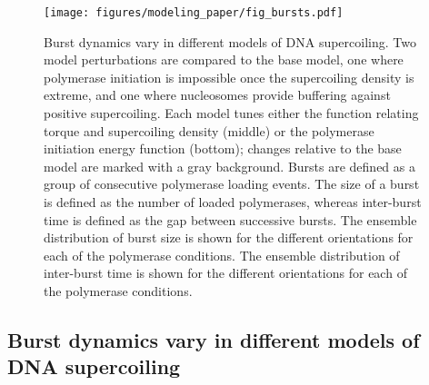 \documentclass[11pt]{article}
\begin{document}
\begin{figure}[htbp]
    \centering
    {\texttt{[image: figures/modeling\_paper/fig\_bursts.pdf]}
    \label{fig:perturbation_overview}
    \label{fig:burst_time_cartoon}
    \label{fig:burst_size_dynamics}
    \label{fig:interburst_time_dynamics}
    }
    \caption{Burst dynamics vary in different models of DNA supercoiling.
         Two model perturbations are compared to the base model, one where polymerase initiation is impossible once the supercoiling density is extreme, and one where nucleosomes provide buffering against positive supercoiling. Each model tunes either the function relating torque and supercoiling density (middle) or the polymerase initiation energy function (bottom); changes relative to the base model are marked with a gray background.
         Bursts are defined as a group of consecutive polymerase loading events. The size of a burst is defined as the number of loaded polymerases, whereas inter-burst time is defined as the gap between successive bursts.
         The ensemble distribution of burst size is shown for the different orientations for each of the polymerase conditions.
         The ensemble distribution of inter-burst time is shown for the different orientations for each of the polymerase conditions.
    }
    \label{fig:top:bursts}
\end{figure}

\subsection{Burst dynamics vary in different models of DNA supercoiling }
\end{document}
